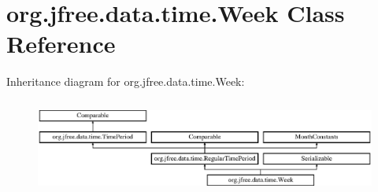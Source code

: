 \hypertarget{classorg_1_1jfree_1_1data_1_1time_1_1_week}{}\section{org.\+jfree.\+data.\+time.\+Week Class Reference}
\label{classorg_1_1jfree_1_1data_1_1time_1_1_week}
Inheritance diagram for org.\+jfree.\+data.\+time.\+Week\+:\begin{figure}[H]
\begin{center}
\leavevmode
\includegraphics[height=3.190883cm]{classorg_1_1jfree_1_1data_1_1time_1_1_week}
\end{center}
\end{figure}
